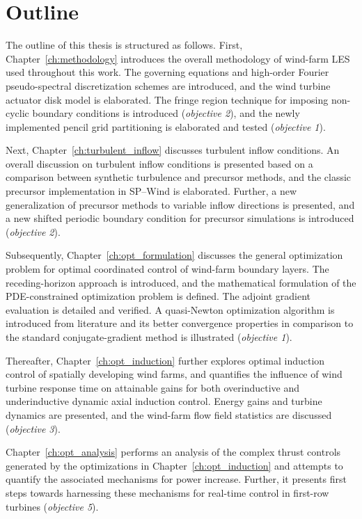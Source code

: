 \section{Outline}\label{sec:intro_outline}
The outline of this thesis is structured as follows. First, Chapter~\ref{ch:methodology} introduces the overall methodology of wind-farm LES used throughout this work. The governing equations and high-order Fourier pseudo-spectral discretization schemes are introduced, and the wind turbine actuator disk model is elaborated. The fringe region technique for imposing non-cyclic boundary conditions is introduced (\emph{objective 2}), and the newly implemented pencil grid partitioning is elaborated and tested (\emph{objective 1}). 

Next, Chapter~\ref{ch:turbulent_inflow} discusses turbulent inflow conditions. An overall discussion on turbulent inflow conditions is presented based on a comparison between synthetic turbulence and precursor methods, and the classic precursor implementation in SP--Wind is elaborated. Further, a new generalization of precursor methods to variable inflow directions is presented, and a new shifted periodic boundary condition for precursor simulations is introduced (\emph{objective 2}).

Subsequently, Chapter~\ref{ch:opt_formulation} discusses the general optimization problem for optimal coordinated control of wind-farm boundary layers. The receding-horizon approach is introduced, and the mathematical formulation of the PDE-constrained optimization problem is defined. The adjoint gradient evaluation is detailed and verified. A quasi-Newton optimization algorithm is introduced from literature and its better convergence properties in comparison to the standard conjugate-gradient method is illustrated (\emph{objective 1}). 

Thereafter, Chapter~\ref{ch:opt_induction} further explores optimal induction control of spatially developing wind farms, and quantifies the influence of wind turbine response time on attainable gains for both overinductive and underinductive dynamic axial induction control. Energy gains and turbine dynamics are presented, and the wind-farm flow field statistics are discussed (\emph{objective 3}).

Chapter~\ref{ch:opt_analysis} performs an analysis of the complex thrust controls generated by the optimizations in Chapter~\ref{ch:opt_induction} and attempts to quantify the associated mechanisms for power increase. Further, it presents first steps towards harnessing these mechanisms for real-time control in first-row turbines (\emph{objective 5}).

